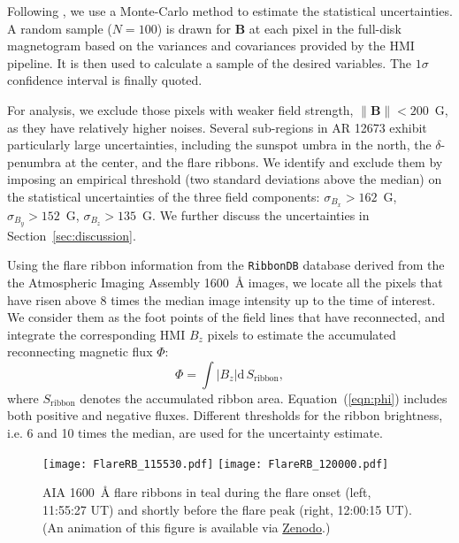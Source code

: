 \documentclass[times,twocolumn]{aastex631}
\begin{document}
\begin{CJK*}{UTF8}{gbsn}

Following \citet{avallone2020}, we use a Monte-Carlo method to estimate the statistical uncertainties. A random sample ($N=100$) is drawn for $\bm{B}$ at each pixel in the full-disk magnetogram based on the variances and covariances provided by the HMI pipeline. It is then used to calculate a sample of the desired variables. The $1\sigma$ confidence interval is finally quoted.

For analysis, we exclude those pixels with weaker field strength, $\lVert\bm{B}\rVert<200$~G, as they have relatively higher noises. Several sub-regions in AR 12673 exhibit particularly large uncertainties, including the sunspot umbra in the north, the $\delta$-penumbra at the center, and the flare ribbons. We identify and exclude them by imposing an empirical threshold (two standard deviations above the median) on the statistical uncertainties of the three field components: $\sigma_{B_x}>162$~G, $\sigma_{B_y}>152$~G, $\sigma_{B_z}>135$~G. We further discuss the uncertainties in Section~\ref{sec:discussion}.

Using the flare ribbon information from the \verb+RibbonDB+ database \citep{kazachenko2017} derived from the the Atmospheric Imaging Assembly \citep{lemen2012} 1600~{\AA} images, we locate all the pixels that have risen above 8 times the median image intensity up to the time of interest. We consider them as the foot points of the field lines that have reconnected, and integrate the corresponding HMI $B_z$ pixels to estimate the accumulated reconnecting magnetic flux $\Phi$:
\begin{equation}
\Phi  = \int \left| B_z \right| \mathrm{d}\,S_\text{ribbon},
\label{eqn:phi}
\end{equation}
where $S_\text{ribbon}$ denotes the accumulated ribbon area. Equation~(\ref{eqn:phi}) includes both positive and negative fluxes. Different thresholds for the ribbon brightness, i.e. 6 and 10 times the median, are used for the uncertainty estimate.


\begin{figure*}[t!]
\centering
\texttt{[image: FlareRB\_115530.pdf]}
\hspace{8mm}
\texttt{[image: FlareRB\_120000.pdf]}
\caption{AIA 1600~{\AA} flare ribbons in teal during the flare onset (left, 11:55:27 UT) and shortly before the flare peak (right, 12:00:15 UT). (An animation of this figure is available via \href{https://doi.org/10.5281/zenodo.5585623}{Zenodo}.)}
\label{fig:flareRB}
\end{figure*}


\end{CJK*}
\end{document}
